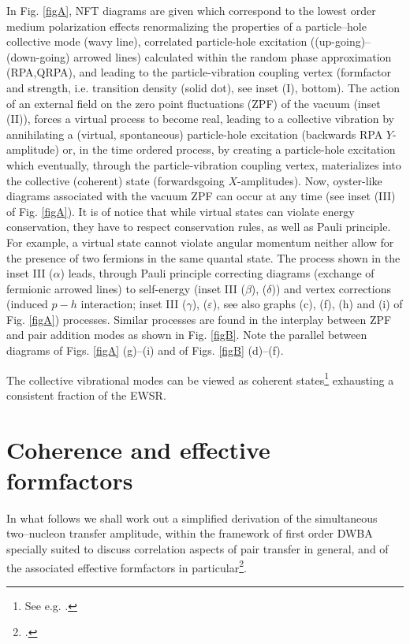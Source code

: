 In Fig.  \ref{figA}, NFT diagrams are given which correspond to the lowest order medium polarization effects renormalizing the properties of a particle--hole collective mode (wavy line), correlated particle-hole excitation  ((up-going)--(down-going) arrowed lines)  calculated within the random phase approximation (RPA,QRPA), and leading to the particle-vibration coupling vertex (formfactor and strength, i.e. transition density (solid dot), see inset (I), bottom). The action of an external field on the zero point fluctuations (ZPF) of the vacuum (inset (II)), forces a virtual process to become real, leading to a collective vibration by annihilating a (virtual, spontaneous) particle-hole excitation (backwards RPA $Y$-amplitude) or, in the time ordered process, by creating a particle-hole excitation which eventually, through the particle-vibration coupling vertex, materializes into the collective (coherent) state (forwardsgoing $X$-amplitudes). Now, oyster-like diagrams associated with the vacuum ZPF can occur at any time (see inset (III) of Fig. \ref{figA}). It is of notice that   while virtual states can violate energy conservation, they have to respect conservation rules, as well as Pauli principle. For example, a virtual state  cannot violate  angular momentum neither allow for the  presence of two fermions in the same quantal state. The process shown in the inset III ($\alpha$) leads, through Pauli principle correcting diagrams (exchange of fermionic arrowed lines) to self-energy (inset III ($\beta$), ($\delta$)) and vertex corrections (induced $p-h$ interaction; inset III ($\gamma$), ($\varepsilon$), see also graphs (c), (f), (h) and (i) of Fig. \ref{figA}) processes. Similar processes are found in the interplay between ZPF 	and pair addition modes as shown in Fig. \ref{figB}. Note the parallel between diagrams of Figs. \ref{figA} (g)--(i) and of Figs. \ref{figB} (d)--(f).


 The collective vibrational modes can be viewed as  coherent states\footnote{See e.g. \cite{Glauber:69,Glauber:07}.} exhausting a consistent fraction of the EWSR.
\section{Coherence and effective formfactors}\label{C7AppB}

In what follows we shall work out  a simplified derivation of the simultaneous two--nucleon transfer amplitude, within the framework of first order DWBA specially suited to discuss correlation aspects of pair transfer in general, and of the associated effective formfactors in particular\footnote{\cite{Glendenning:65,Bayman:67}.}. 


